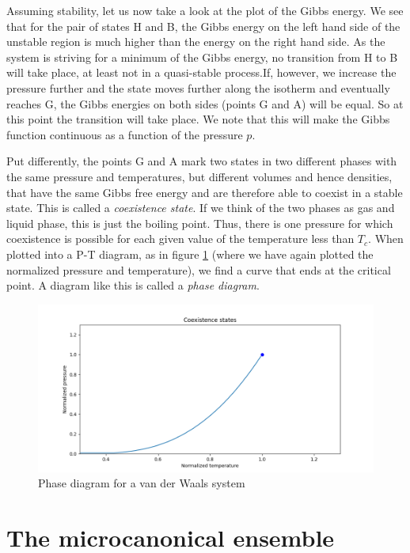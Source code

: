 \documentclass[a4paper, draft]{report}
\numberwithin{section}{chapter}
\numberwithin{equation}{chapter}
\theoremstyle{own}
\theoremstyle{remark}
\begin{document}
Assuming stability, let us now take a look at the plot of the Gibbs energy. We see that for the pair of states H and B, the Gibbs energy on the left hand side of the unstable region is much higher than the energy on the right hand side. As the system is striving for a minimum of the Gibbs energy, no transition from H to B will take place, at least not in a quasi-stable process.If, however, we increase the pressure further and the state moves further along the isotherm and eventually reaches G, the Gibbs energies on both sides (points G and A) will be equal. So at this point the transition will take place. We note that this will make the Gibbs function continuous as a function of the pressure $p$. 

Put differently, the points G and A mark two states in two different phases with the same pressure and temperatures, but different volumes and hence densities, that have the same Gibbs free energy and are therefore able to coexist in a stable state. This is called a {\em coexistence state}. If we think of the two phases as gas and liquid phase, this is just the boiling point. Thus, there is one pressure for which coexistence is possible for each given value of the temperature less than $T_c$. When plotted into a P-T diagram, as in figure \ref{fig:VanDerWaalsPhaseDiagram} (where we have again plotted the normalized pressure and temperature), we find a curve that ends at the critical point. A diagram like this is called a {\em phase diagram}.

\begin{figure}[ht]
\centering
\includegraphics[scale=0.5]{VanDerWaalsPhaseDiagram}
\caption{Phase diagram for a van der Waals system}
\label{fig:VanDerWaalsPhaseDiagram}
\end{figure}
 


\section{The microcanonical ensemble}
\end{document}
